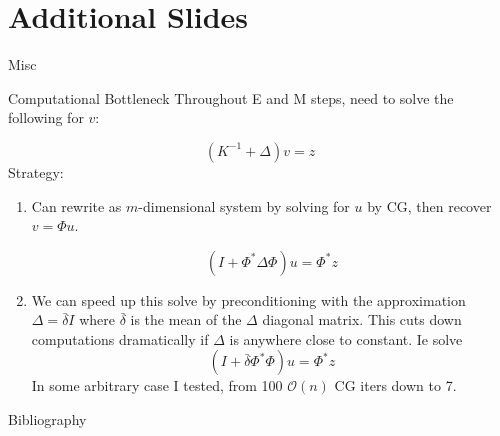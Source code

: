 \documentclass[aspectratio=169,xcolor=dvipsnames]{beamer}
\begin{document}
\section{Additional Slides}
\begin{frame}{Misc}
\end{frame}
\begin{frame}{Computational Bottleneck}
    Throughout E and M steps, need to solve the following for $v$:

    $$(K^{-1} + \Delta )v = z$$
Strategy:
\begin{enumerate}
    \item Can rewrite as $m$-dimensional system by solving for $u$ by CG, then recover $v = \Phi u$.

    $$(I + \Phi^* \Delta \Phi) u =\Phi^* z $$
    \item  We can speed up this solve by preconditioning with the approximation $\Delta = \bar \delta I$ where $\bar \delta$ is the mean of the $\Delta$ diagonal matrix. This cuts down computations dramatically if $\Delta$ is anywhere close to constant. Ie solve
  $$(I + \bar{\delta} \Phi^* \Phi)u = \Phi^* z$$
  In some arbitrary case I tested, from 100 $\mathcal O(n)$ CG iters down to 7. 
    \end{enumerate}
\end{frame}
\begin{frame}{Bibliography}

\end{frame}
\end{document}
